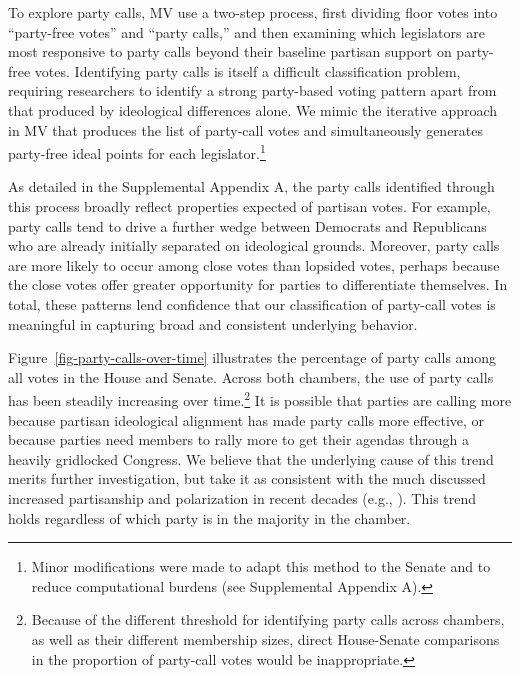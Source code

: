 \documentclass[12pt]{article}
\begin{document}
To explore party calls, MV use a two-step process, first dividing floor votes into ``party-free votes'' and ``party calls,'' and then examining which legislators are most responsive to party calls beyond their baseline partisan support on party-free votes.  Identifying party calls is itself a difficult classification problem, requiring researchers to identify a strong party-based voting pattern apart from that produced by ideological differences alone.  We mimic the iterative approach in MV that produces the list of party-call votes and simultaneously generates party-free ideal points for each legislator.\footnote{\doublespacing\normalsize Minor modifications were made to adapt this method to the Senate and to reduce computational burdens (see Supplemental Appendix A).}

As detailed in the Supplemental Appendix A, the party calls identified through this process broadly reflect properties expected of partisan votes.  For example, party calls tend to drive a further wedge between Democrats and Republicans who are already initially separated on ideological grounds.  Moreover, party calls are more likely to occur among close votes than lopsided votes, perhaps because the close votes offer greater opportunity for parties to differentiate themselves.  In total, these patterns lend confidence that our classification of party-call votes is meaningful in capturing broad and consistent underlying behavior.

Figure~\ref{fig-party-calls-over-time} illustrates the percentage of party calls among all votes in the House and Senate.  Across both chambers, the use of party calls has been steadily increasing over time.\footnote{\doublespacing\normalsize Because of the different threshold for identifying party calls across chambers, as well as their different membership sizes, direct House-Senate comparisons in the proportion of party-call votes would be inappropriate.
}  It is possible that parties are calling more because partisan ideological alignment has made party calls more effective, or because parties need members to rally more to get their agendas through a heavily gridlocked Congress.  We believe that the underlying cause of this trend merits further investigation, but take it as consistent with the much discussed increased partisanship and polarization in recent decades (e.g., \cite{Aldrich:2000, Lee:2009, Lee:2016, Theriault:2013, Smith:2014}). This trend holds regardless of which party is in the majority in the chamber.
\end{document}
